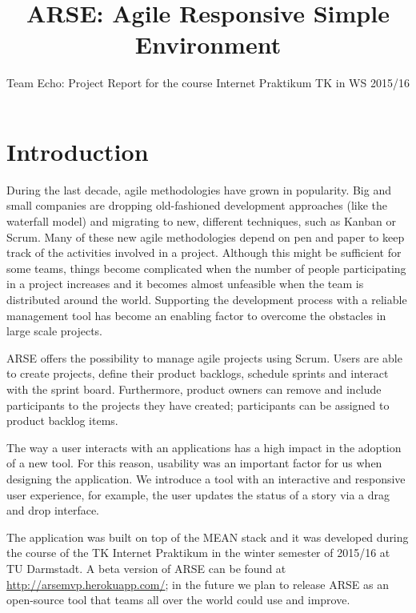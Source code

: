 \documentclass[
	accentcolor=tud1a %
]{tudreport}
\begin{document}
\title{ARSE: Agile Responsive Simple Environment}
\subtitle{Team Echo: Project Report for the course Internet Praktikum TK in WS 2015/16}

\maketitle

\tableofcontents

\chapter{Introduction}
\label{ch:introduction}

During the last decade, agile methodologies have grown in popularity. Big and small companies are dropping old-fashioned development approaches (like the waterfall model) and migrating to new, different techniques, such as Kanban or Scrum. Many of these new agile methodologies depend on pen and paper to keep track of the activities involved in a project. Although this might be sufficient for some teams, things become complicated when the number of people participating in a project increases and it becomes almost unfeasible when the team is distributed around the world. Supporting the development process with a reliable management tool has become an enabling factor to overcome the obstacles in large scale projects.

ARSE offers the possibility to manage agile projects using Scrum. Users are able to create projects, define their product backlogs, schedule sprints and interact with the sprint board. Furthermore, product owners can remove and include participants to the projects they have created; participants can be assigned to product backlog items. 

The way a user interacts with an applications has a high impact in the adoption of a new tool. For this reason, usability was an important factor for us when designing the application. We introduce a tool with an interactive and responsive user experience, for example, the user updates the status of a story via a drag and drop interface.

The application was built on top of the MEAN stack and it was developed during the course of the TK Internet Praktikum in the winter semester of 2015/16 at TU Darmstadt. A beta version of ARSE can be found at \url{http://arsemvp.herokuapp.com/}; in the future we plan to release ARSE as an open-source tool that teams all over the world could use and improve. 
\end{document}
